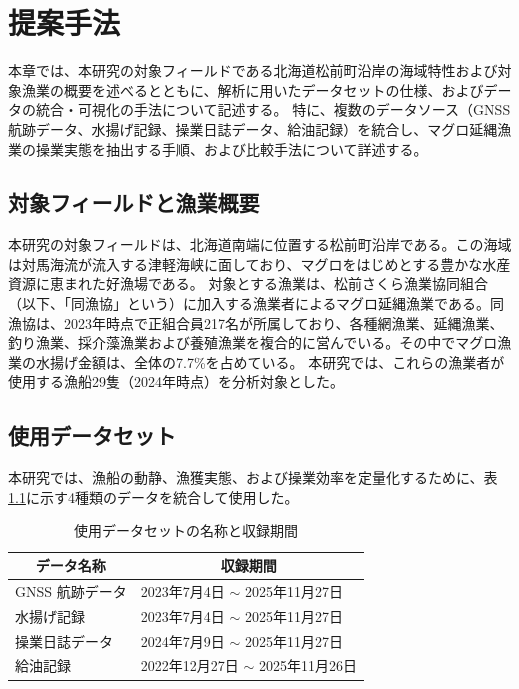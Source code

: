 \chapter{提案手法}
本章では、本研究の対象フィールドである北海道松前町沿岸の海域特性および対象漁業の概要を述べるとともに、解析に用いたデータセットの仕様、およびデータの統合・可視化の手法について記述する。
特に、複数のデータソース（GNSS航跡データ、水揚げ記録、操業日誌データ、給油記録）を統合し、マグロ延縄漁業の操業実態を抽出する手順、および比較手法について詳述する。

\section{対象フィールドと漁業概要}
本研究の対象フィールドは、北海道南端に位置する松前町沿岸である。この海域は対馬海流が流入する津軽海峡に面しており、マグロをはじめとする豊かな水産資源に恵まれた好漁場である。
対象とする漁業は、松前さくら漁業協同組合（以下、「同漁協」という）に加入する漁業者によるマグロ延縄漁業である。同漁協は、2023年時点で正組合員217名が所属しており、各種網漁業、延縄漁業、釣り漁業、採介藻漁業および養殖漁業を複合的に営んでいる。その中でマグロ漁業の水揚げ金額は、全体の7.7\%を占めている。
本研究では、これらの漁業者が使用する漁船29隻（2024年時点）を分析対象とした。

\section{使用データセット}
本研究では、漁船の動静、漁獲実態、および操業効率を定量化するために、表\ref{tab:data_period}に示す4種類のデータを統合して使用した。

\begin{table}[h!]
    \centering
    \caption{使用データセットの名称と収録期間}
    \label{tab:data_period}
    \begin{tabular}{|l|l|} \hline
        \multicolumn{1}{|c|}{データ名称} & \multicolumn{1}{c|}{収録期間} \\ \hline \hline
        GNSS 航跡データ & 2023年7月4日 $\sim$ 2025年11月27日  \\
        水揚げ記録 & 2023年7月4日 $\sim$ 2025年11月27日  \\
        操業日誌データ & 2024年7月9日 $\sim$ 2025年11月27日  \\ 
        給油記録 & 2022年12月27日 $\sim$ 2025年11月26日  \\
        \hline
    \end{tabular}
\end{table}

